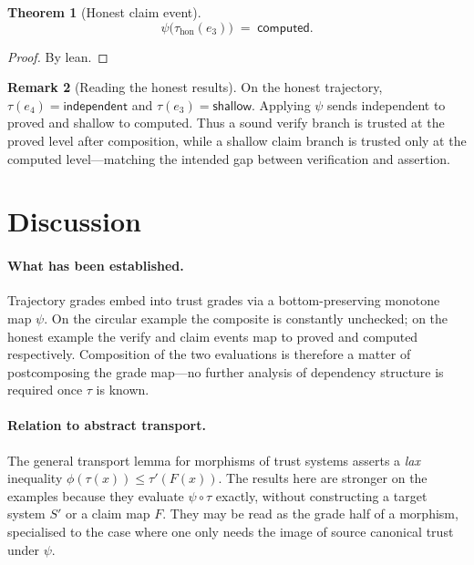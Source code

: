 \documentclass[11pt,a4paper]{article}
\theoremstyle{plain}
\newtheorem{theorem}{Theorem}[section]
\theoremstyle{definition}
\newtheorem{remark}[theorem]{Remark}
\newcommand{\tauu}{\tau}
\begin{document}
\begin{theorem}[Honest claim event]\label{thm:psi-honest-e3}
\begin{equation}
  \psi\bigl(\tauu_{\mathrm{hon}}(e_3)\bigr)
  \;=\;
  \mathsf{computed}.
\end{equation}
\end{theorem}

\begin{proof}
By lean.
\end{proof}

\begin{remark}[Reading the honest results]
On the honest trajectory, $\tauu(e_4) = \mathsf{independent}$ and
$\tauu(e_3) = \mathsf{shallow}$. Applying $\psi$ sends independent to proved
and shallow to computed. Thus a sound verify branch is trusted at the proved
level after composition, while a shallow claim branch is trusted only at the
computed level---matching the intended gap between verification and
assertion.
\end{remark}

\section{Discussion}

\paragraph{What has been established.}
Trajectory grades embed into trust grades via a bottom-preserving monotone
map $\psi$. On the circular example the composite is constantly unchecked;
on the honest example the verify and claim events map to proved and
computed respectively. Composition of the two evaluations is therefore a
matter of postcomposing the grade map---no further analysis of dependency
structure is required once $\tauu$ is known.

\paragraph{Relation to abstract transport.}
The general transport lemma for morphisms of trust systems asserts a
\emph{lax} inequality $\phi(\tauu(x)) \le \tauu'(F(x))$. The results here
are stronger on the examples because they evaluate $\psi \circ \tauu$
exactly, without constructing a target system $S'$ or a claim map $F$. They
may be read as the grade half of a morphism, specialised to the case where
one only needs the image of source canonical trust under $\psi$.
\end{document}

